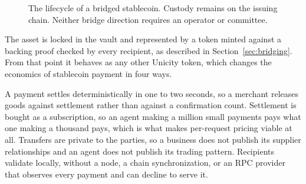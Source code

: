 \begin{figure}[htbp]
    \centering
    \caption{The lifecycle of a bridged stablecoin. Custody remains on the issuing chain. Neither bridge direction requires an operator or committee.}
    \label{fig:stablecoin}
\end{figure}

The asset is locked in the vault and represented by a token minted against a backing proof checked by every recipient, as described in Section~\ref{sec:bridging}. From that point it behaves as any other Unicity token, which changes the economics of stablecoin payment in four ways.

A payment settles deterministically in one to two seconds, so a merchant releases goods against settlement rather than against a confirmation count. Settlement is bought as a subscription, so an agent making a million small payments pays what one making a thousand pays, which is what makes per-request pricing viable at all. Transfers are private to the parties, so a business does not publish its supplier relationships and an agent does not publish its trading pattern. Recipients validate locally, without a node, a chain synchronization, or an RPC provider that observes every payment and can decline to serve it.

